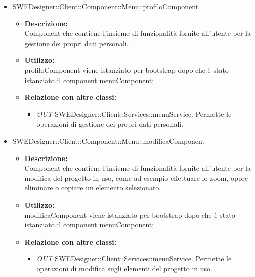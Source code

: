 \begin{itemize}
\begin{itemize}
		\item SWEDesigner::Client::Component::Menu::profiloComponent		
		\begin{itemize}
			\item \textbf{Descrizione:}\\
			Component che contiene l'insieme di funzionalità fornite all'utente per la gestione dei propri dati personali.
			\item \textbf{Utilizzo:}\\
			profiloComponent viene istanziato per bootstrap dopo che è stato istanziato il component menuComponent;
			\item \textbf{Relazione con altre classi:}\\
			\begin{itemize}
			\item \emph{OUT} SWEDesigner::Client::Services::menuService. Permette le operazioni di gestione dei propri dati personali.
			\end{itemize}
		\end{itemize}
		
		\item SWEDesigner::Client::Component::Menu::modificaComponent		
		\begin{itemize}
			\item \textbf{Descrizione:}\\
			Component che contiene l'insieme di funzionalità fornite all'utente per la modifica del progetto in uso, come ad esempio effettuare lo zoom, oppre eliminare o copiare un elemento selezionato.
			\item \textbf{Utilizzo:}\\
			modificaComponent viene istanziato per bootstrap dopo che è stato istanziato il component menuComponent;
			\item \textbf{Relazione con altre classi:}\\
			\begin{itemize}
			\item \emph{OUT} SWEDesigner::Client::Services::menuService. Permette le operazioni di modifica sugli elementi del progetto in uso.
			\end{itemize}
		\end{itemize}
		

\end{itemize}
\end{itemize}
